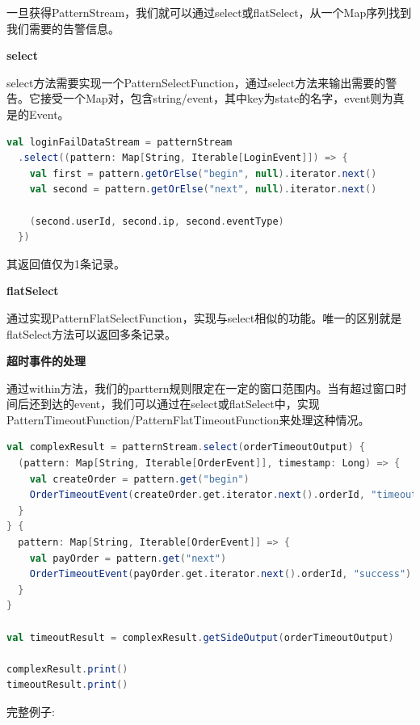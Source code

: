 \documentclass[oneside]{ctexbook}
\begin{document}
一旦获得PatternStream，我们就可以通过select或flatSelect，从一个Map序列找到我们需要的告警信息。

\textbf{select}

select方法需要实现一个PatternSelectFunction，通过select方法来输出需要的警告。它接受一个Map对，包含string/event，其中key为state的名字，event则为真是的Event。

\begin{lstlisting}[language=scala]
val loginFailDataStream = patternStream
  .select((pattern: Map[String, Iterable[LoginEvent]]) => {
    val first = pattern.getOrElse("begin", null).iterator.next()
    val second = pattern.getOrElse("next", null).iterator.next()

    (second.userId, second.ip, second.eventType)
  })
\end{lstlisting}

其返回值仅为1条记录。

\textbf{flatSelect}

通过实现PatternFlatSelectFunction，实现与select相似的功能。唯一的区别就是flatSelect方法可以返回多条记录。

\textbf{超时事件的处理}

通过within方法，我们的parttern规则限定在一定的窗口范围内。当有超过窗口时间后还到达的event，我们可以通过在select或flatSelect中，实现PatternTimeoutFunction/PatternFlatTimeoutFunction来处理这种情况。

\begin{lstlisting}[language=scala]
val complexResult = patternStream.select(orderTimeoutOutput) {
  (pattern: Map[String, Iterable[OrderEvent]], timestamp: Long) => {
    val createOrder = pattern.get("begin")
    OrderTimeoutEvent(createOrder.get.iterator.next().orderId, "timeout")
  }
} {
  pattern: Map[String, Iterable[OrderEvent]] => {
    val payOrder = pattern.get("next")
    OrderTimeoutEvent(payOrder.get.iterator.next().orderId, "success")
  }
}

val timeoutResult = complexResult.getSideOutput(orderTimeoutOutput)

complexResult.print()
timeoutResult.print()
\end{lstlisting}

完整例子:
\end{document}
